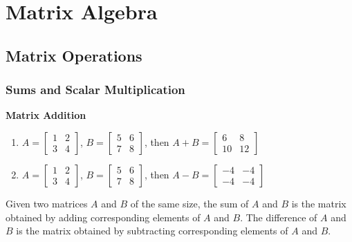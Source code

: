 \documentclass[10pt, a4paper]{article}
\begin{document}
\newpage

\section{Matrix Algebra}
\subsection{Matrix Operations}
\subsubsection*{Sums and Scalar Multiplication}
\begin{example}
    \textbf{Matrix Addition}
    \begin{enumerate}
        \item $A = \begin{bmatrix} 1 & 2 \\ 3 & 4 \end{bmatrix}$, $B = \begin{bmatrix} 5 & 6 \\ 7 & 8 \end{bmatrix}$, then $A + B = \begin{bmatrix} 6 & 8 \\ 10 & 12 \end{bmatrix}$
        \item $A = \begin{bmatrix} 1 & 2 \\ 3 & 4 \end{bmatrix}$, $B = \begin{bmatrix} 5 & 6 \\ 7 & 8 \end{bmatrix}$, then $A - B = \begin{bmatrix} -4 & -4 \\ -4 & -4 \end{bmatrix}$
    \end{enumerate}
\end{example}
Given two matrices $A$ and $B$ of the same size, the sum of $A$ and $B$ is the matrix obtained by adding corresponding elements of $A$ and $B$. The difference of $A$ and $B$ is the matrix obtained by subtracting corresponding elements of $A$ and $B$.
\end{document}
